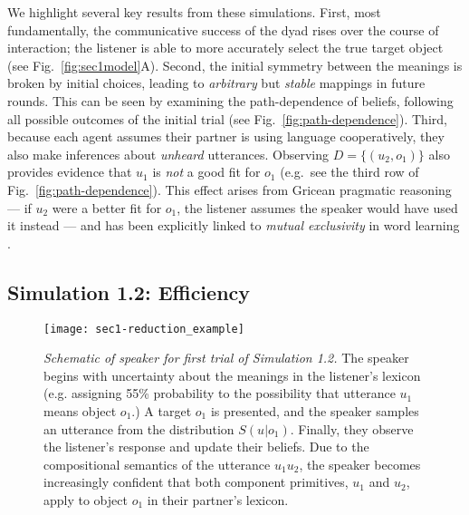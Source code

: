 We highlight several key results from these simulations.
First, most fundamentally, the communicative success of the dyad rises over the course of interaction; the listener is able to more accurately select the true target object (see Fig.~\ref{fig:sec1model}A). 
Second, the initial symmetry between the meanings is broken by initial choices, leading to \emph{arbitrary} but \emph{stable} mappings in future rounds.
This can be seen by examining the path-dependence of beliefs, following all possible outcomes of the initial trial (see Fig.~\ref{fig:path-dependence}). 
Third, because each agent assumes their partner is using language cooperatively, they also make inferences about \emph{unheard} utterances. 
Observing $D = \{(u_2, o_1)\}$ also provides evidence that $u_1$ is \emph{not} a good fit for $o_1$ (e.g.~see the third row of Fig.~\ref{fig:path-dependence}).
This effect arises from Gricean pragmatic reasoning --- if $u_2$ were a better fit for $o_1$, the listener assumes the speaker would have used it instead --- and has been explicitly linked to \emph{mutual exclusivity} in word learning \cite{FrankGoodmanTenenbaum09_Wurwur,smith_learning_2013}.

\subsection{Simulation 1.2: Efficiency}

\begin{figure*}
\centering
    \texttt{[image: sec1-reduction\_example]}
    \vspace{1em}
  \caption{\emph{Schematic of speaker for first trial of Simulation 1.2.} The speaker begins with uncertainty about the meanings in the listener's lexicon (e.g. assigning 55\% probability to the possibility that utterance $u_1$ means object $o_1$.) A target $o_1$ is presented, and the speaker samples an utterance from the distribution $S(u|o_1)$. Finally, they observe the listener's response and update their beliefs. Due to the compositional semantics of the utterance $u_1u_2$, the speaker becomes increasingly confident that both component primitives, $u_1$ and $u_2$, apply to object $o_1$ in their partner's lexicon.}
  \label{fig:sec1efficiency}
\end{figure*}

